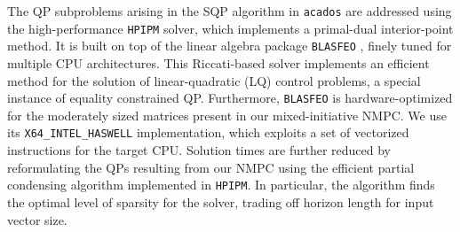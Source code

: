 The QP subproblems arising in the SQP algorithm in \texttt{acados} are addressed using the high-performance \texttt{HPIPM} \cite{frison2020} solver, which implements a primal-dual interior-point method. It is built on top of the linear algebra package \texttt{BLASFEO} \cite{frison2018}, finely tuned for multiple CPU architectures. This Riccati-based solver implements an efficient method for the solution of linear-quadratic (LQ) control problems, a special instance of equality constrained QP. Furthermore, \texttt{BLASFEO} is hardware-optimized for the moderately sized matrices present in our mixed-initiative NMPC. We use its \texttt{X64\_INTEL\_HASWELL} implementation, which exploits a set of vectorized instructions for the target CPU. Solution times are further reduced by reformulating the QPs resulting from our NMPC using the efficient partial condensing algorithm implemented in \texttt{HPIPM}. In particular, the algorithm finds the optimal level of sparsity for the solver, trading off horizon length for input vector size.